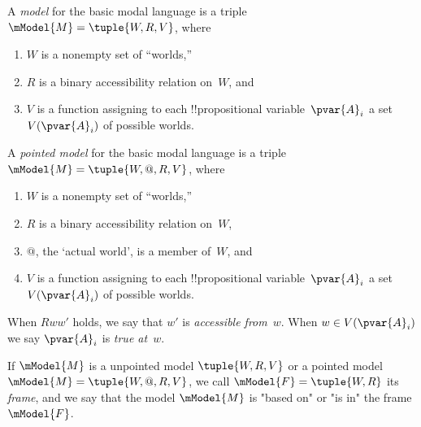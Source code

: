 \documentclass[../../../../include/open-logic-section]{subfiles}
\begin{document}



\begin{defn}[Models]
    A \emph{model} for the basic modal language is a triple $\mModel{M}
    = \tuple{W, R, V}$, where
    \begin{enumerate}
    \item $W$ is a nonempty set of ``worlds,''
    \item $R$ is a binary accessibility relation on~$W$, and
    \item $V$ is a function assigning to each !!{propositional
      variable}~$\pvar{A}_i$ a set $V(\pvar{A}_i)$ of possible worlds.
    \end{enumerate}
\end{defn}

\begin{defn}
    A \emph{pointed model} for the basic modal language is a triple
    $\mModel{M} = \tuple{W, @, R, V}$, where
    \begin{enumerate}
    \item $W$ is a nonempty set of ``worlds,''
    \item $R$ is a binary accessibility relation on~$W$,
    \item $@$, the `actual world', is a member of~$W$, and
    \item $V$ is a function assigning to each !!{propositional
      variable}~$\pvar{A}_i$ a set $V(\pvar{A}_i)$ of possible worlds.
    \end{enumerate}
\end{defn}

When $Rww'$ holds, we say that $w'$ is \emph{accessible
from}~$w$. When $w \in V(\pvar{A}_i)$ we say $\pvar{A}_i$ is \emph{true at}~$w$.

\begin{defn}[Frames]
If $\mModel{M}$ is a unpointed model $\tuple{W, R, V}$ or a pointed
model $\mModel{M}=\tuple{W, @, R, V}$, we call $\mModel{F}=\tuple{W,
R}$ its \emph{frame}, and we say that the model $\mModel{M}$ is "based
on" or "is in" the frame $\mModel{F}$.
\end{defn}
\end{document}
